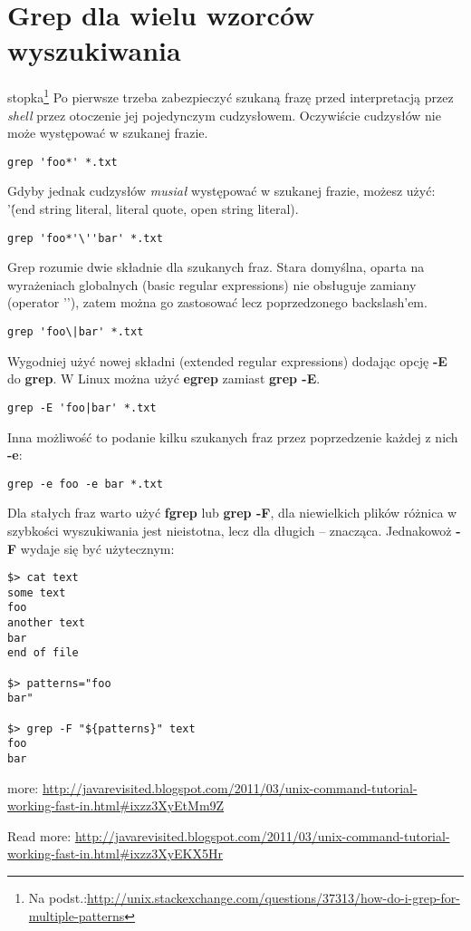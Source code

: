 \documentclass[a4paper,titlepage,12pt]{mwart}
\begin{document}
\section{Grep dla wielu wzorców wyszukiwania}
stopka\footnote{Na podst.:\url{http://unix.stackexchange.com/questions/37313/how-do-i-grep-for-multiple-patterns}}
Po pierwsze trzeba zabezpieczyć szukaną frazę przed interpretacją przez \textit{shell} przez otoczenie jej pojedynczym cudzysłowem. Oczywiście cudzysłów nie może występować w szukanej frazie.
\begin{verbatim}
grep 'foo*' *.txt
\end{verbatim}
Gdyby jednak cudzysłów \textit{musiał} występować w szukanej frazie, możesz użyć: '\' (end string literal, literal quote, open string literal).
\begin{verbatim}
grep 'foo*'\''bar' *.txt
\end{verbatim}
Grep rozumie dwie składnie dla szukanych fraz. Stara domyślna, oparta na wyrażeniach globalnych (basic regular expressions) nie obsługuje zamiany (operator '\textbar'), zatem można go zastosować lecz poprzedzonego backslash'em.
\begin{verbatim}
grep 'foo\|bar' *.txt
\end{verbatim}
Wygodniej użyć nowej składni (extended regular expressions) dodając opcję \textbf{-E} do \textbf{grep}. W Linux można użyć \textbf{egrep} zamiast \textbf{grep -E}.
\begin{verbatim}
grep -E 'foo|bar' *.txt
\end{verbatim}
Inna możliwość to podanie kilku szukanych fraz przez poprzedzenie każdej z nich \textbf{-e}:
\begin{verbatim}
grep -e foo -e bar *.txt
\end{verbatim}
Dla stałych fraz warto użyć \textbf{fgrep} lub \textbf{grep -F}, dla niewielkich plików różnica w szybkości wyszukiwania jest nieistotna, lecz dla długich -- znacząca.\newline
Jednakowoż \textbf{-F} wydaje się być użytecznym:
\begin{verbatim}
$> cat text
some text
foo
another text
bar
end of file

$> patterns="foo
bar" 

$> grep -F "${patterns}" text
foo
bar
\end{verbatim}

 more: \url{http://javarevisited.blogspot.com/2011/03/unix-command-tutorial-working-fast-in.html\#ixzz3XyEtMm9Z}


Read more: \url{http://javarevisited.blogspot.com/2011/03/unix-command-tutorial-working-fast-in.html#ixzz3XyEKX5Hr}
\end{document}
